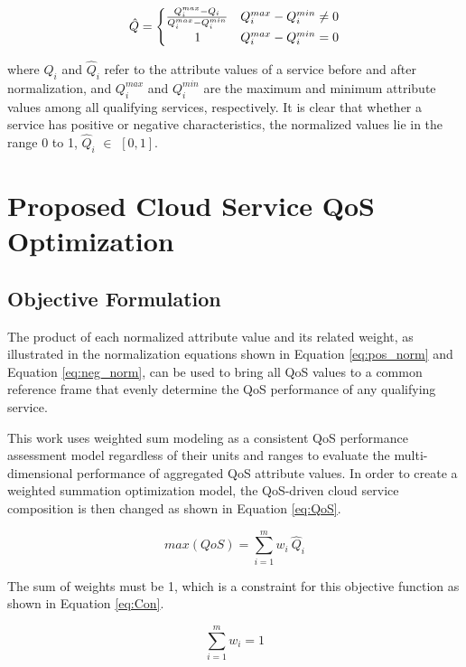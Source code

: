 \documentclass[3p,twocolumn]{elsarticle}
\theoremstyle{thmstyleone}%
\theoremstyle{thmstyletwo}%
\theoremstyle{thmstylethree}%
\begin{document}
\begin{equation}
\hat{Q}=
\begin{cases}
\frac{Q_i^{max}-Q_i}{Q_i^{max}-Q_i^{min}} & Q_i^{max}-Q_i^{min} \neq 0\\    
\hspace{0.8cm}1 &    Q_i^{max}-Q_i^{min} = 0
\end{cases}
\label{eq:neg_norm}
\end{equation}

where $Q_i$ and $\hat{Q}_i$ refer to the attribute values of a service before and after normalization, and $Q^{max}_i$ and $Q^{min}_i$ are the maximum and minimum attribute values among all qualifying services, respectively. It is clear that whether a service has positive or negative characteristics, the normalized values lie in the range 0 to 1, $\hat{Q}_i$ $\in$ $[0, 1]$.

\section{Proposed Cloud Service QoS Optimization}

\subsection{Objective Formulation}

The product of each normalized attribute value and its related weight, as illustrated in the normalization equations shown in Equation \ref{eq:pos_norm} and Equation \ref{eq:neg_norm}, can be used to bring all QoS values to a common reference frame that evenly determine the QoS performance of any qualifying service.

This work uses weighted sum modeling as a consistent QoS performance assessment model regardless of their units and ranges to evaluate the multi-dimensional performance of aggregated QoS attribute values. In order to create a weighted summation optimization model, the QoS-driven cloud service composition is then changed as shown in Equation \ref{eq:QoS}. 

\begin{equation}
max(QoS)=\sum_{i=1}^{m} w_i ~ \hat{Q}_i
\label{eq:QoS}
\end{equation}

The sum of weights must be 1, which is a constraint for this objective function as shown in Equation \ref{eq:Con}.

\begin{equation}
\sum_{i=1}^{m}w_i=1
\label{eq:Con}
\end{equation}
\end{document}

